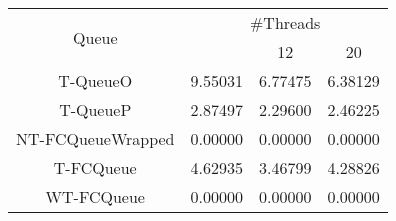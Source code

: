 \begin{tabular}{|c|c|c|c|}
\hline
\multirow{2}{*}{Queue} & \multicolumn{3}{c|}{\#Threads}\\\cline{2-4}& \quad 4 & 12 & 20\\
\hline
\hline
T-QueueO & 9.55031 & 6.77475 & 6.38129\\
T-QueueP & 2.87497 & 2.29600 & 2.46225\\
NT-FCQueueWrapped & 0.00000 & 0.00000 & 0.00000\\
T-FCQueue & 4.62935 & 3.46799 & 4.28826\\
WT-FCQueue & 0.00000 & 0.00000 & 0.00000\\
\hline\end{tabular}
